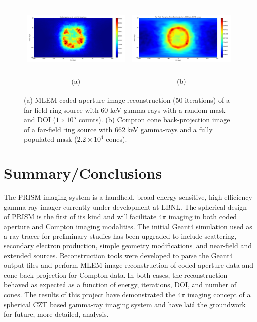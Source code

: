 \documentclass[10pt]{article}
\begin{document}
\begin{figure}[htb!]
\hypertarget{fig7}{}
\centering
\begin{tabular}{cc}
	\includegraphics[height=100pt]{Figures/FarfieldRing_60_DOI.png} & 
	\includegraphics[height=100pt]{Figures/FarfieldRing_662.png} \\ [-0.5ex]
	\scriptsize{(a)} & \scriptsize{(b)}
\end{tabular}
\caption{(a) MLEM coded aperture image reconstruction (50 iterations) of a far-field ring source with 60 keV gamma-rays with a random mask and DOI ($1\times10^5$ counts). (b) Compton cone back-projection image of a far-field ring source with 662 keV gamma-rays and a fully populated mask ($2.2\times10^4$ cones).}
\end{figure}



\section{Summary/Conclusions}

The PRISM imaging system is a handheld, broad energy sensitive, high efficiency gamma-ray imager currently under development at LBNL. The spherical design of PRISM is the first of its kind and will facilitate 4$\pi$ imaging in both coded aperture and Compton imaging modalities. The initial Geant4 simulation used as a ray-tracer for preliminary studies has been upgraded to include scattering, secondary electron production, simple geometry modifications, and near-field and extended sources. Reconstruction tools were developed to parse the Geant4 output files and perform MLEM image reconstruction of coded aperture data and cone back-projection for Compton data. In both cases, the reconstruction behaved as expected as a function of energy, iterations, DOI, and number of cones. The results of this project have demonstrated the 4$\pi$ imaging concept of a spherical CZT based gamma-ray imaging system and have laid the groundwork for future, more detailed, analysis.
\end{document}
